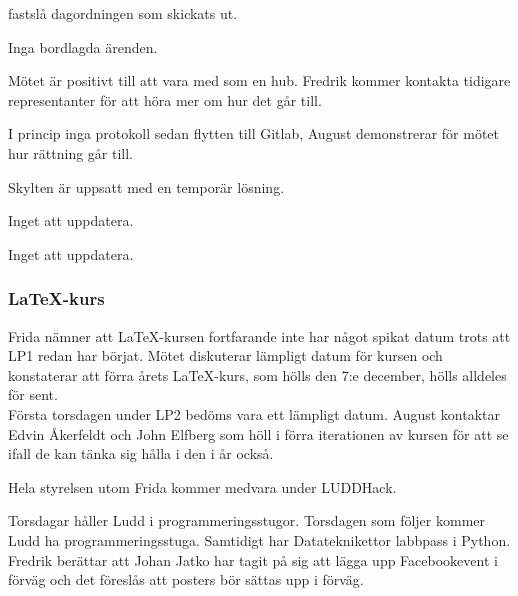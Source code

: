 \documentclass{protokoll}
\begin{document}
\newpage  


\begin{beslut}
     \att fastslå dagordningen som skickats ut.
\end{beslut}

Inga bordlagda ärenden.

Mötet är positivt till att vara med som en hub. Fredrik kommer kontakta tidigare representanter för att höra mer om hur det går till.

I princip inga protokoll sedan flytten till Gitlab, August demonstrerar för mötet hur rättning går till. 

Skylten är uppsatt med en temporär lösning. 

Inget att uppdatera. 

Inget att uppdatera. 

\subsubsection{LaTeX-kurs}
Frida nämner att LaTeX-kursen fortfarande inte har något spikat datum trots att LP1 redan har börjat. Mötet diskuterar lämpligt datum för kursen och konstaterar att förra årets LaTeX-kurs, som hölls den 7:e december, hölls alldeles för sent. \\
Första torsdagen under LP2 bedöms vara ett lämpligt datum. 
August kontaktar Edvin Åkerfeldt och John Elfberg som höll i förra iterationen av kursen för att se ifall de kan tänka sig hålla i den i år också. 



Hela styrelsen utom Frida kommer medvara under LUDDHack. 

Torsdagar håller Ludd i programmeringsstugor. Torsdagen som följer kommer Ludd ha programmeringsstuga. Samtidigt har Datateknikettor labbpass i Python. Fredrik berättar att Johan Jatko har tagit på sig att lägga upp Facebookevent i förväg och det föreslås att posters bör sättas upp i förväg. 
\end{document}
